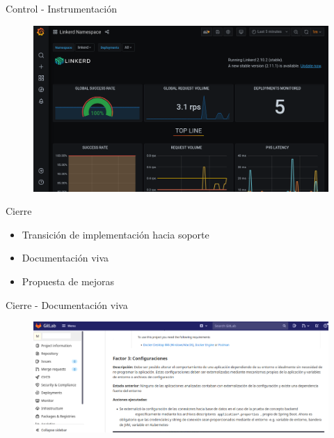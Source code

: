 \documentclass[aspectratio=169]{beamer}
\begin{document}
\begin{frame}{Control - Instrumentación}
\begin{figure}
	\centering
	\includegraphics[width=\linewidth]{Images/grafana}
\end{figure}
\end{frame}

\begin{frame}{Cierre}
\begin{itemize}
\item Transición de implementación hacia soporte
\item Documentación viva
\item Propuesta de mejoras
\end{itemize}
\end{frame}

\begin{frame}{Cierre - Documentación viva}
\begin{figure}
	\centering
	\includegraphics[width=\linewidth]{Images/docviva}
\end{figure}
\end{frame}
\end{document}
